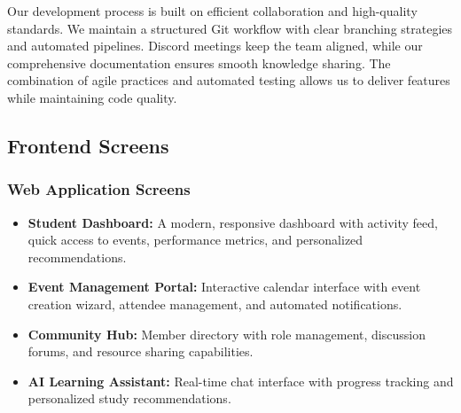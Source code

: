 Our development process is built on efficient collaboration and high-quality standards. We maintain a structured Git workflow with clear branching strategies and automated pipelines. Discord meetings keep the team aligned, while our comprehensive documentation ensures smooth knowledge sharing. The combination of agile practices and automated testing allows us to deliver features while maintaining code quality.

\subsection{Frontend Screens}
\label{subsec:frontend_screens}

\subsubsection{Web Application Screens}
\label{subsubsec:web_screens}

\begin{itemize}
    \item \textbf{Student Dashboard:} A modern, responsive dashboard with activity feed, quick access to events, performance metrics, and personalized recommendations.
    
    \item \textbf{Event Management Portal:} Interactive calendar interface with event creation wizard, attendee management, and automated notifications.
    
    \item \textbf{Community Hub:} Member directory with role management, discussion forums, and resource sharing capabilities.
    
    \item \textbf{AI Learning Assistant:} Real-time chat interface with progress tracking and personalized study recommendations.
\end{itemize}

